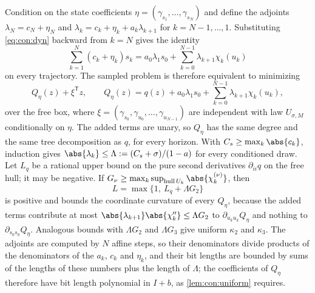Condition on the state coefficients $\eta=(\gamma_{s_1},\dots,\gamma_{s_N})$
and define the adjoints $\lambda_N=c_N+\eta_N$ and
$\lambda_k=c_k+\eta_k+a_k\lambda_{k+1}$ for $k=N-1,\dots,1$. Substituting
\eqref{eq:con:dyn} backward from $k=N$ gives the identity
\begin{equation}\label{eq:con:adjoint}
 \sum_{k=1}^N(c_k+\eta_k)s_k=a_0\lambda_1s_0+\sum_{k=0}^{N-1}\lambda_{k+1}\chi_k(u_k)
\end{equation}
on every trajectory. The sampled problem is therefore equivalent to
minimizing
\[
 Q_\eta(z)+\xi^{\mathsf T}z,\qquad
 Q_\eta(z)=q(z)+a_0\lambda_1s_0+\sum_{k=0}^{N-1}\lambda_{k+1}\chi_k(u_k),
\]
over the free box, where $\xi=(\gamma_{s_0},\gamma_{u_0},\dots,\gamma_{u_{N-1}})$
are independent with law $U_{\sigma,M}$ conditionally on $\eta$. The added
terms are unary, so $Q_\eta$ has the same degree and the same tree
decomposition as $q$, for every horizon. With $C_s\ge\max_k\abs{c_k}$,
induction gives $\abs{\lambda_k}\le\Lambda:=(C_s+\sigma)/(1-a)$ for every
conditioned draw. Let $L_q$ be a rational upper bound on the pure second
derivatives $\partial_{ii}q$ on the free hull; it may be negative. If
$G_\nu\ge\max_k\sup_{\operatorname{hull}U_k}\abs{\chi_k^{(\nu)}}$, then
\begin{equation}\label{eq:con:Lact}
 L=\max\{1,\ L_q+\Lambda G_2\}
\end{equation}
is positive and bounds the coordinate curvature of every $Q_\eta$, because
the added terms contribute at most $\abs{\lambda_{k+1}}\abs{\chi_k''}\le
\Lambda G_2$ to $\partial_{u_ku_k}Q_\eta$ and nothing to
$\partial_{s_0s_0}Q_\eta$. Analogous bounds with $\Lambda G_2$ and
$\Lambda G_3$ give uniform $\kappa_2$ and $\kappa_3$. The adjoints are
computed by $N$ affine steps, so their denominators divide products of the
denominators of the $a_k$, $c_k$ and $\eta_k$, and their bit lengths are
bounded by sums of the lengths of these numbers plus the length of
$\Lambda$; the coefficients of $Q_\eta$ therefore have
bit length polynomial in $I+b$, as \cref{lem:con:uniform} requires.

